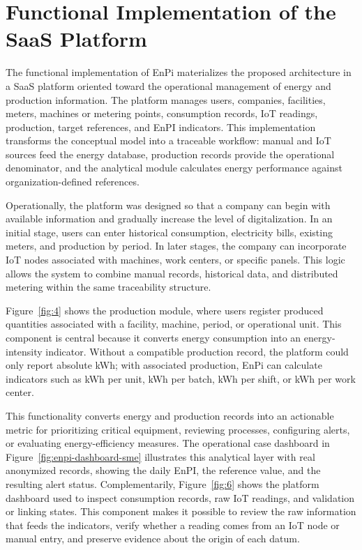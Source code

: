 \documentclass{ieeeaccess}
\begin{document}
\section{Functional Implementation of the SaaS Platform}
\label{sec:functional-implementation}

The functional implementation of EnPi materializes the proposed architecture in a SaaS platform oriented toward the operational management of energy and production information. The platform manages users, companies, facilities, meters, machines or metering points, consumption records, IoT readings, production, target references, and EnPI indicators. This implementation transforms the conceptual model into a traceable workflow: manual and IoT sources feed the energy database, production records provide the operational denominator, and the analytical module calculates energy performance against organization-defined references.

Operationally, the platform was designed so that a company can begin with available information and gradually increase the level of digitalization. In an initial stage, users can enter historical consumption, electricity bills, existing meters, and production by period. In later stages, the company can incorporate IoT nodes associated with machines, work centers, or specific panels. This logic allows the system to combine manual records, historical data, and distributed metering within the same traceability structure.

Figure~\ref{fig:4} shows the production module, where users register produced quantities associated with a facility, machine, period, or operational unit. This component is central because it converts energy consumption into an energy-intensity indicator. Without a compatible production record, the platform could only report absolute kWh; with associated production, EnPi can calculate indicators such as kWh per unit, kWh per batch, kWh per shift, or kWh per work center.

This functionality converts energy and production records into an actionable metric for prioritizing critical equipment, reviewing processes, configuring alerts, or evaluating energy-efficiency measures. The operational case dashboard in Figure~\ref{fig:enpi-dashboard-sme} illustrates this analytical layer with real anonymized records, showing the daily EnPI, the reference value, and the resulting alert status. Complementarily, Figure~\ref{fig:6} shows the platform dashboard used to inspect consumption records, raw IoT readings, and validation or linking states. This component makes it possible to review the raw information that feeds the indicators, verify whether a reading comes from an IoT node or manual entry, and preserve evidence about the origin of each datum.
\end{document}
